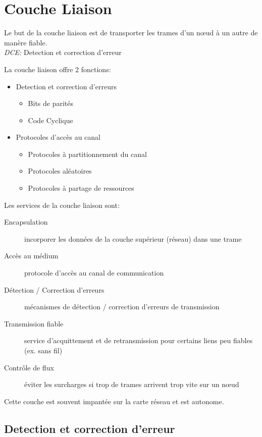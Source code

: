 \documentclass[a4paper, 12pt, french]{article}
\begin{document}
	\section{Couche Liaison}

	Le but de la couche liaison est de transporter les trames d'un nœud à un autre de manère fiable.\\

	\emph{DCE: } Detection et correction d'erreur

	La couche liaison offre 2 fonctions:
	\begin{itemize}
		\item Detection et correction d'erreurs
		\begin{itemize}
			\item Bits de parités
			\item Code Cyclique
		\end{itemize}
		\item Protocoles d'accès au canal
		\begin{itemize}
			\item Protocoles à partitionnement du canal
			\item Protocoles aléatoires
			\item Protocoles à partage de ressources
		\end{itemize}
	\end{itemize}

	Les services de la couche liaison sont:
	\begin{description}
		\item[Encapsulation] incorporer les données de la couche supérieur (réseau) dans une trame
		\item[Accès au médium] protocole d'accès au canal de communication
		\item[Détection / Correction d'erreurs] mécanismes de détection / correction d'erreurs de transmission
		\item[Transmission fiable] service d'acquittement et de retransmission pour certains liens peu fiables (ex. sans fil)
		\item[Contrôle de flux] éviter les surcharges si trop de trames arrivent trop vite sur un nœud
	\end{description}

	Cette couche est souvent impantée sur la carte réseau et est autonome.

	\subsection{Detection et correction d'erreur}
\end{document}
